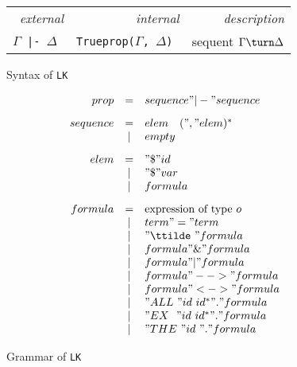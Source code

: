 \begin{figure}
\begin{center}
\begin{tabular}{rrr} 
  \it external          & \it internal  & \it description \\ 
  \tt $\Gamma$ |- $\Delta$  &  \tt Trueprop($\Gamma$, $\Delta$) &
        sequent $\Gamma\turn \Delta$ 
\end{tabular}
\end{center}
\caption{Syntax of {\tt LK}} \label{lk-syntax}
\end{figure}


\begin{figure} 
\dquotes
\[\begin{array}{rcl}
    prop & = & sequence " |- " sequence 
\\[2ex]
sequence & = & elem \quad (", " elem)^* \\
         & | & empty 
\\[2ex]
    elem & = & "\$ " id \\
         & | & "\$ " var \\
         & | & formula 
\\[2ex]
 formula & = & \hbox{expression of type~$o$} \\
         & | & term " = " term \\
         & | & "\ttilde\ " formula \\
         & | & formula " \& " formula \\
         & | & formula " | " formula \\
         & | & formula " --> " formula \\
         & | & formula " <-> " formula \\
         & | & "ALL~" id~id^* " . " formula \\
         & | & "EX~~" id~id^* " . " formula \\
         & | & "THE~" id~     " . " formula
  \end{array}
\]
\caption{Grammar of {\tt LK}} \label{lk-grammar}
\end{figure}


